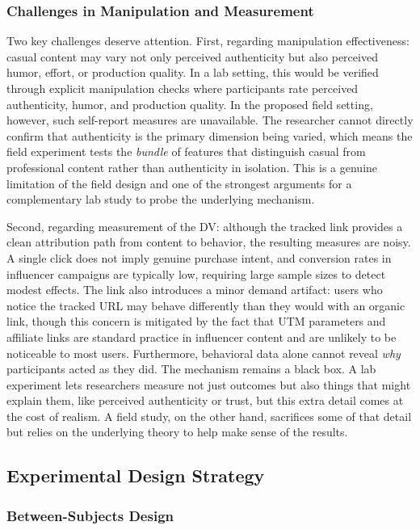 \documentclass[10pt]{article}
\begin{document}
\subsubsection{Challenges in Manipulation and Measurement}

Two key challenges deserve attention. First, regarding manipulation effectiveness: casual content may vary not only perceived authenticity but also perceived humor, effort, or production quality. In a lab setting, this would be verified through explicit manipulation checks where participants rate perceived authenticity, humor, and production quality. In the proposed field setting, however, such self-report measures are unavailable. The researcher cannot directly confirm that authenticity is the primary dimension being varied, which means the field experiment tests the \textit{bundle} of features that distinguish casual from professional content rather than authenticity in isolation. This is a genuine limitation of the field design and one of the strongest arguments for a complementary lab study to probe the underlying mechanism.

Second, regarding measurement of the DV: although the tracked link provides a clean attribution path from content to behavior, the resulting measures are noisy. A single click does not imply genuine purchase intent, and conversion rates in influencer campaigns are typically low, requiring large sample sizes to detect modest effects. The link also introduces a minor demand artifact: users who notice the tracked URL may behave differently than they would with an organic link, though this concern is mitigated by the fact that UTM parameters and affiliate links are standard practice in influencer content and are unlikely to be noticeable to most users. Furthermore, behavioral data alone cannot reveal \textit{why} participants acted as they did. The mechanism remains a black box. A lab experiment lets researchers measure not just outcomes but also things that might explain them, like perceived authenticity or trust, but this extra detail comes at the cost of realism. A field study, on the other hand, sacrifices some of that detail but relies on the underlying theory to help make sense of the results.
\newpage 
\subsection{Experimental Design Strategy}

\subsubsection{Between-Subjects Design}
\end{document}

